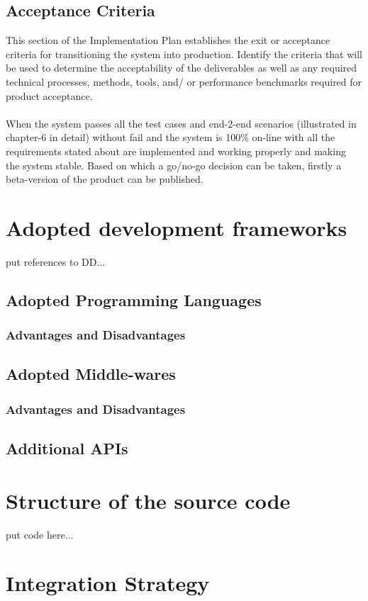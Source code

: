 \documentclass[a4paper, hidelinks, 12pt]{report}
\begin{document}
\section{Acceptance Criteria}
This section of the Implementation Plan establishes the exit or acceptance criteria for transitioning the system into production. Identify the criteria that will be used to determine the acceptability of the deliverables as well as any required technical processes, methods, tools, and/ or performance benchmarks required for product acceptance. \\\\
When the system passes all the test cases and end-2-end scenarios (illustrated in chapter-6 in detail) without fail and the system is 100\% on-line with all the requirements stated about are implemented and working properly and making the system stable. Based on which a go/no-go decision can be taken, firstly a beta-version of the product can be published.
	
	\chapter{Adopted development frameworks}
put references to DD...
	\section{Adopted Programming Languages}
	\subsection{Advantages and Disadvantages}
	\section{Adopted Middle-wares}
	\subsection{Advantages and Disadvantages}
	\section{Additional APIs}

\chapter{Structure of the source code}
put code here...		


	\chapter{Integration Strategy}
\end{document}
